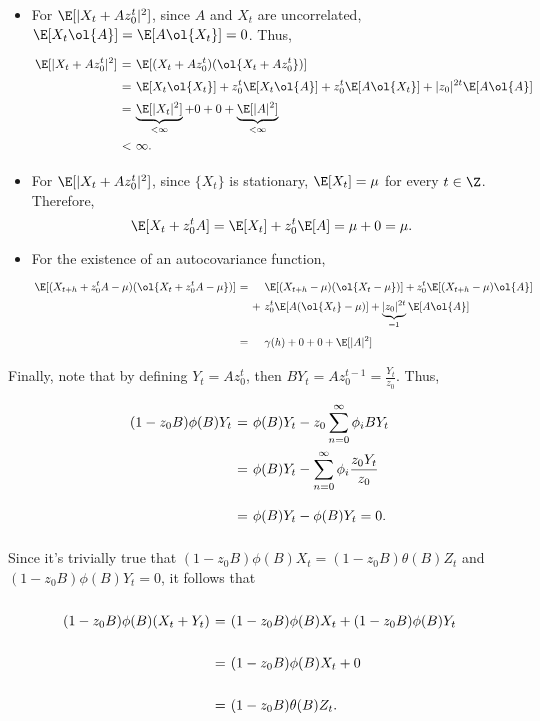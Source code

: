 \begin{itemize}
    \item For $\E[|X_t + Az_0^t|^2]$, since $A$ and $X_t$ are uncorrelated, $\E[X_t \ol{A}] = \E[A \ol{X_t}] = 0$. Thus,
    \[ \displaystyle \everymath{\displaystyle}
    \arraycolsep=1.8pt\def\arraystretch{1.5}
    \begin{array}{rcl}
        \E[|X_t + Az_0^t|^2] & = & \E[(X_t + Az_0^t)(\ol{X_t + Az_0^t})]\\
        & = & \E[X_t \ol{X_t}] + z_0^t \E[X_t \ol{A}] + z_0^t \E[A \ol{X_t}] + |z_0|^{2t} \E[A \ol{A}]\\
        & = & \underbrace{\E[|X_t|^2]}_{<\infty} + 0 + 0 + \underbrace{\E[|A|^2]}_{<\infty}\\
        & < & \infty.
    \end{array}\]
    \item For $\E[|X_t + Az_0^t|^2]$, since $\{X_t\}$ is stationary, $\E[X_t] = \mu$ for every $t\in \Z$. Therefore,
    \[ \E[X_t + z_0^t A] = \E[X_t] + z_0^t \E[A] = \mu + 0 = \mu. \]
    \item For the existence of an autocovariance function,
    \[ \displaystyle \everymath{\displaystyle}
    \arraycolsep=1.8pt\def\arraystretch{1.5}
    \begin{array}{rcll}
        \E[(X_{t+h} + z_0^t A - \mu)(\ol{X_{t} + z_0^t A - \mu})] & = & & \E[(X_{t+h}-\mu) (\ol{X_t-\mu})] + z_0^t \E[(X_{t+h}-\mu) \ol{A}]\\
        & & + & z_0^t \E[A (\ol{X_t}-\mu)] + \underbrace{|z_0|^{2t}}_{=1} \E[A \ol{A}]\\[1.5em]
        & = & & \gamma(h) + 0 + 0 + \E[|A|^2]
    \end{array}\]
\end{itemize}

Finally, note that by defining $Y_t = A z_0^t$, then $B Y_t = A z_0^{t-1} = \frac{Y_t}{z_0}$. Thus,
\[ \everymath{\displaystyle}
\arraycolsep=1.8pt\def\arraystretch{2.5}
\begin{array}{rcl}
    (1-z_0 B) \phi(B) Y_t & = & \phi(B) Y_t - z_0 \sum_{n = 0}^{\infty} \phi_i B Y_t\\
    & = & \phi(B) Y_t - \sum_{n = 0}^{\infty} \phi_i \frac{z_0 Y_t}{z_0}\\
    & = & \phi(B) Y_t - \phi(B) Y_t = 0.
\end{array} \]

Since it's trivially true that $(1-z_0 B) \phi(B) X_t = (1-z_0 B) \theta(B) Z_t$ and $(1-z_0 B) \phi(B) Y_t = 0$, it follows that
\[ \everymath{\displaystyle}
\arraycolsep=1.8pt\def\arraystretch{2.5}
\begin{array}{rcl}
    (1-z_0 B) \phi(B) (X_t+Y_t) & = & (1-z_0 B) \phi(B) X_t + (1-z_0 B) \phi(B) Y_t\\
    & = & (1-z_0 B) \phi(B) X_t + 0\\
    & = & (1-z_0 B) \theta(B) Z_t.
\end{array}  \]
